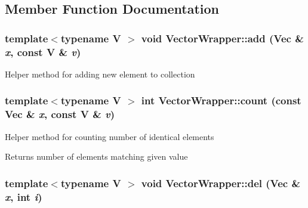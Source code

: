 \subsection{Member Function Documentation}
\hypertarget{struct_stl_containers_wrappers_1_1_vector_wrapper_a1e74442e7917385090e381ba20413389}{
\subsubsection[{add}]{\setlength{\rightskip}{0pt plus 5cm}template$<$typename V $>$ void VectorWrapper::add (Vec \& {\em x}, \/  const V \& {\em v})}}
\label{struct_stl_containers_wrappers_1_1_vector_wrapper_a1e74442e7917385090e381ba20413389}
Helper method for adding new element to collection \hypertarget{struct_stl_containers_wrappers_1_1_vector_wrapper_a3449d24986cb6bd5ca927a32aaaef065}{
\subsubsection[{count}]{\setlength{\rightskip}{0pt plus 5cm}template$<$typename V $>$ int VectorWrapper::count (const Vec \& {\em x}, \/  const V \& {\em v})}}
\label{struct_stl_containers_wrappers_1_1_vector_wrapper_a3449d24986cb6bd5ca927a32aaaef065}
Helper method for counting number of identical elements \begin{DoxyReturn}{Returns}
number of elements matching given value 
\end{DoxyReturn}
\hypertarget{struct_stl_containers_wrappers_1_1_vector_wrapper_a40311c89e3818c22ad283161f0417bca}{
\subsubsection[{del}]{\setlength{\rightskip}{0pt plus 5cm}template$<$typename V $>$ void VectorWrapper::del (Vec \& {\em x}, \/  int {\em i})}}
